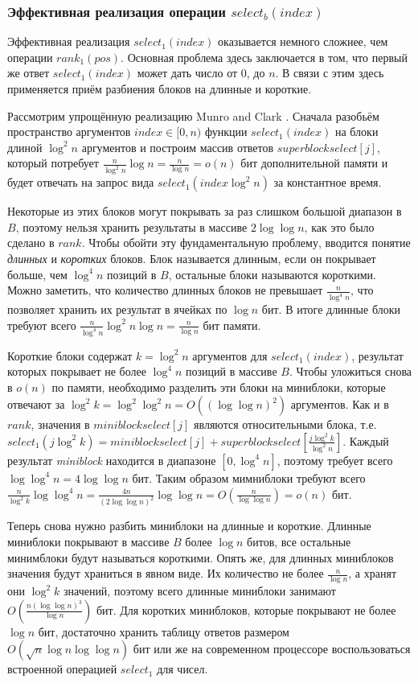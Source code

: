 \documentclass[a4paper,12pt]{article}
\begin{document}
\subsubsection{Эффективная реализация операции $select_b(index)$}
Эффективная реализация $select_1(index)$ оказывается немного сложнее, чем операции $rank_1(pos)$. Основная проблема здесь заключается в том, что первый же ответ $select_1(index)$ может дать число от $0$, до $n$. В связи с этим здесь применяется приём разбиения блоков на длинные и короткие.

Рассмотрим упрощённую реализацию Munro and Clark \cite{clark1996efficient}. Сначала разобьём пространство аргументов $index \in [0, n)$ функции $select_1(index)$ на блоки длиной $\log^2{n}$ аргументов и построим массив ответов $superblockselect[j]$, который потребует
$\frac{n}{\log^2{n}}\log{n} = \frac{n}{\log{n}} = o(n)$ бит дополнительной памяти и будет отвечать на запрос вида $select_1({index} \log^2{n})$ за константное время.

Некоторые из этих блоков могут покрывать за раз слишком большой диапазон в $B$, поэтому нельзя хранить результаты в массиве $2\log\log n$, как это было сделано в $rank$. Чтобы обойти эту фундаментальную проблему, вводится понятие \textit{длинных} и \textit{коротких} блоков. Блок называется длинным, если он покрывает больше, чем $\log^4{n}$ позиций в $B$, остальные блоки называются короткими. Можно заметить, что количество длинных блоков не превышает $\frac{n}{\log^4{n}}$, что позволяет хранить их результат в ячейках по $\log n$ бит. В итоге длинные блоки требуют всего $\frac{n}{\log^4{n}} \log^2{n} \log n = \frac{n}{\log{n}}$ бит памяти.

Короткие блоки содержат $k = \log^2{n}$ аргументов для $select_1({index})$, результат которых покрывает не более $\log^4{n}$ позиций в массиве $B$. Чтобы уложиться снова в $o(n)$ по памяти, необходимо разделить эти блоки на миниблоки, которые отвечают за $\log^2{k} = \log^2{\log^2{n}} = O((\log \log n)^2)$ аргументов. Как и в $rank$, значения в $miniblockselect[j]$ являются относительными блока, т.е.
${select}_1(j \log^2{k}) = {miniblockselect}[j] + {superblockselect}[\frac{j \log^2{k}}{\log^2{n}}]$. Каждый результат \textit{miniblock} находится в диапазоне $[0, \log^4{n}]$, поэтому требует всего $\log \log^4{n} = 4\log\log n$ бит. Таким образом мимниблоки требуют всего $\frac{n}{\log^2{k}} \log \log^4{n} = \frac{4 n}{(2\log \log n)^2} \log \log n = O(\frac{n}{\log \log n}) = o(n)$ бит.

Теперь снова нужно разбить миниблоки на длинные и короткие. Длинные миниблоки покрывают в массиве $B$ более $\log n$ битов, все остальные минимблоки будут называться короткими. Опять же, для длинных миниблоков значения будут храниться в явном виде. Их количество не более $\frac{n}{\log n}$, а хранят они $\log^2{k}$ значений, поэтому всего длинные миниблоки занимают $O(\frac{n(\log \log n)^3}{\log n})$ бит. Для коротких миниблоков, которые покрывают не более $\log n$ бит, достаточно хранить таблицу ответов размером $O(\sqrt{n}\log{n}\log\log {n})$ бит или же на современном процессоре воспользоваться встроенной операцией $select_1$ для чисел.
\end{document}
